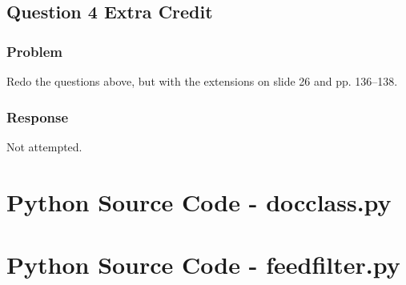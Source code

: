\documentclass[letterpaper,11pt]{report}
\begin{document}
\begin{savenotes}
\section{Question 4 Extra Credit}
\subsection{Problem}Redo the questions above, but with the extensions on slide 26 and pp. 136--138.
\subsection{Response}Not attempted.

\end{savenotes}




\appendix
{}

\chapter{Python Source Code - docclass.py} \label{chap:pythona}

\chapter{Python Source Code - feedfilter.py} \label{chap:pythonb}

\end{document}
